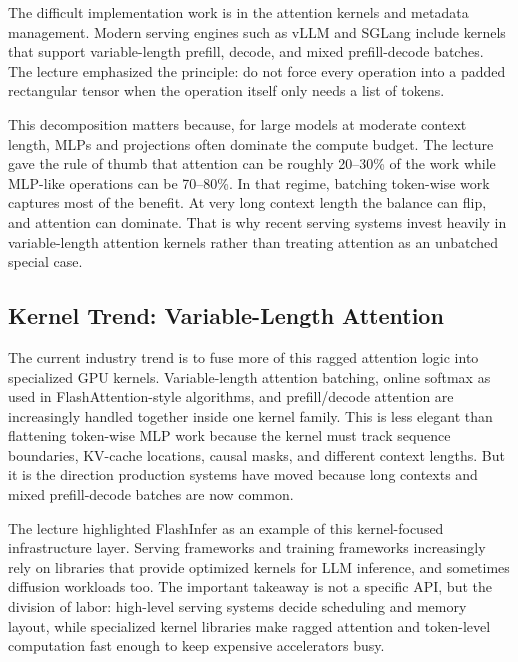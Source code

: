 \documentclass[11pt]{article}
\begin{document}
The difficult implementation work is in the attention kernels and metadata management.  Modern serving engines such as vLLM and SGLang include kernels that support variable-length prefill, decode, and mixed prefill-decode batches.  The lecture emphasized the principle: do not force every operation into a padded rectangular tensor when the operation itself only needs a list of tokens.

This decomposition matters because, for large models at moderate context length, MLPs and projections often dominate the compute budget.  The lecture gave the rule of thumb that attention can be roughly 20--30\% of the work while MLP-like operations can be 70--80\%.  In that regime, batching token-wise work captures most of the benefit.  At very long context length the balance can flip, and attention can dominate.  That is why recent serving systems invest heavily in variable-length attention kernels rather than treating attention as an unbatched special case.

\subsection{Kernel Trend: Variable-Length Attention}

The current industry trend is to fuse more of this ragged attention logic into specialized GPU kernels.  Variable-length attention batching, online softmax as used in FlashAttention-style algorithms, and prefill/decode attention are increasingly handled together inside one kernel family.  This is less elegant than flattening token-wise MLP work because the kernel must track sequence boundaries, KV-cache locations, causal masks, and different context lengths.  But it is the direction production systems have moved because long contexts and mixed prefill-decode batches are now common.

The lecture highlighted FlashInfer as an example of this kernel-focused infrastructure layer.  Serving frameworks and training frameworks increasingly rely on libraries that provide optimized kernels for LLM inference, and sometimes diffusion workloads too.  The important takeaway is not a specific API, but the division of labor: high-level serving systems decide scheduling and memory layout, while specialized kernel libraries make ragged attention and token-level computation fast enough to keep expensive accelerators busy.
\end{document}

